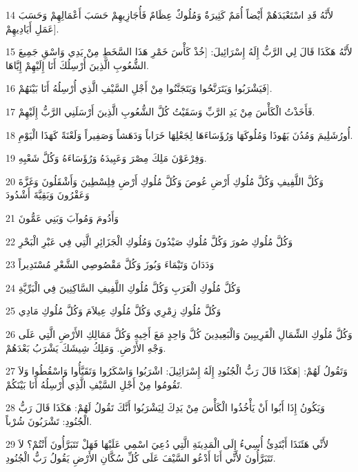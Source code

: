 \par 14 لأَنَّهُ قَدِ اسْتَعْبَدَهُمْ أَيْضاً أُمَمٌ كَثِيرَةٌ وَمُلُوكٌ عِظَامٌ فَأُجَازِيهِمْ حَسَبَ أَعْمَالِهِمْ وَحَسَبَ عَمَلِ أَيَادِيهِمْ].
\par 15 لأَنَّهُ هَكَذَا قَالَ لِي الرَّبُّ إِلَهُ إِسْرَائِيلَ: [خُذْ كَأْسَ خَمْرِ هَذَا السَّخَطِ مِنْ يَدِي وَاسْقِ جَمِيعَ الشُّعُوبِ الَّذِينَ أُرْسِلُكَ أَنَا إِلَيْهِمْ إِيَّاهَا.
\par 16 فَيَشْرَبُوا وَيَتَرَنَّحُوا وَيَتَجَنَّنُوا مِنْ أَجْلِ السَّيْفِ الَّذِي أُرْسِلُهُ أَنَا بَيْنَهُمْ].
\par 17 فَأَخَذْتُ الْكَأْسَ مِنْ يَدِ الرَّبِّ وَسَقَيْتُ كُلَّ الشُّعُوبِ الَّذِينَ أَرْسَلَنِي الرَّبُّ إِلَيْهِمْ.
\par 18 أُورُشَلِيمَ وَمُدُنَ يَهُوذَا وَمُلُوكَهَا وَرُؤَسَاءَهَا لِجَعْلِهَا خَرَاباً وَدَهَشاً وَصَفِيراً وَلَعْنَةً كَهَذَا الْيَوْمِ.
\par 19 وَفِرْعَوْنَ مَلِكَ مِصْرَ وَعَبِيدَهُ وَرُؤَسَاءَهُ وَكُلَّ شَعْبِهِ.
\par 20 وَكُلَّ اللَّفِيفِ وَكُلَّ مُلُوكِ أَرْضِ عُوصَ وَكُلَّ مُلُوكِ أَرْضِ فِلِسْطِينَ وَأَشْقَلُونَ وَغَزَّةَ وَعَقْرُونَ وَبَقِيَّةَ أَشْدُودَ
\par 21 وَأَدُومَ وَمُوآبَ وَبَنِي عَمُّونَ
\par 22 وَكُلَّ مُلُوكِ صُورَ وَكُلَّ مُلُوكِ صَيْدُونَ وَمُلُوكِ الْجَزَائِرِ الَّتِي فِي عَبْرِ الْبَحْرِ
\par 23 وَدَدَانَ وَتَيْمَاءَ وَبُوزَ وَكُلَّ مَقْصُوصِي الشَّعْرِ مُسْتَدِيراً
\par 24 وَكُلَّ مُلُوكِ الْعَرَبِ وَكُلَّ مُلُوكِ اللَّفِيفِ السَّاكِنِينَ فِي الْبَرِّيَّةِ
\par 25 وَكُلَّ مُلُوكِ زِمْرِي وَكُلَّ مُلُوكِ عِيلاَمَ وَكُلَّ مُلُوكِ مَادِي
\par 26 وَكُلَّ مُلُوكِ الشِّمَالِ الْقَرِيبِينَ وَالْبَعِيدِينَ كُلَّ وَاحِدٍ مَعَ أَخِيهِ وَكُلَّ مَمَالِكِ الأَرْضِ الَّتِي عَلَى وَجْهِ الأَرْضِ. وَمَلِكُ شِيشَكَ يَشْرَبُ بَعْدَهُمْ.
\par 27 وَتَقُولُ لَهُمْ: [هَكَذَا قَالَ رَبُّ الْجُنُودِ إِلَهُ إِسْرَائِيلَ: اشْرَبُوا وَاسْكَرُوا وَتَقَيَّأُوا وَاسْقُطُوا وَلاَ تَقُومُوا مِنْ أَجْلِ السَّيْفِ الَّذِي أُرْسِلُهُ أَنَا بَيْنَكُمْ.
\par 28 وَيَكُونُ إِذَا أَبُوا أَنْ يَأْخُذُوا الْكَأْسَ مِنْ يَدِكَ لِيَشْرَبُوا أَنَّكَ تَقُولُ لَهُمْ: هَكَذَا قَالَ رَبُّ الْجُنُودِ: تَشْرَبُونَ شُرْباً.
\par 29 لأَنِّي هَئَنَذَا أَبْتَدِئُ أُسِيءُ إِلَى الْمَدِينَةِ الَّتِي دُعِيَ اسْمِي عَلَيْهَا فَهَلْ تَتَبَرَّأُونَ أَنْتُمْ؟ لاَ تَتَبَرَّأُونَ لأَنِّي أَنَا أَدْعُو السَّيْفَ عَلَى كُلِّ سُكَّانِ الأَرْضِ يَقُولُ رَبُّ الْجُنُودِ.
